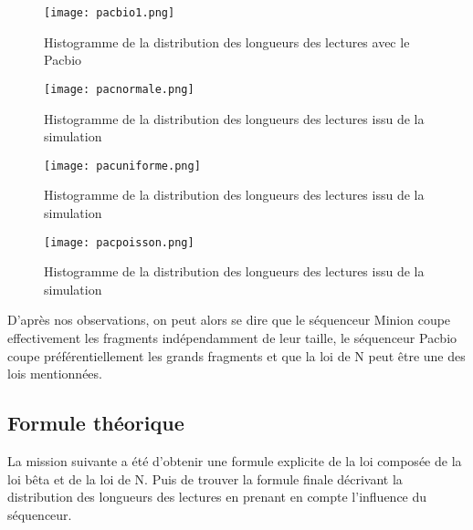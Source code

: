 \documentclass[11pt,a4paper]{article} %
\begin{document}
\begin{figure}[h]
    \begin{minipage}[c]{.46\linewidth}
        \centering
        \texttt{[image: pacbio1.png]}
        \caption{\small Histogramme de la distribution des longueurs des lectures avec le Pacbio}
    \end{minipage}
    \hfill%
    \begin{minipage}[c]{.46\linewidth}
        \centering
        \texttt{[image: pacnormale.png]}
        \caption{\small Histogramme de la distribution des longueurs des lectures issu de la simulation}
    \end{minipage}
\end{figure} 
\begin{figure}[h]
    \begin{minipage}[c]{.46\linewidth}
        \centering
        \texttt{[image: pacuniforme.png]}
        \caption{\small Histogramme de la distribution des longueurs des lectures issu de la simulation}
    \end{minipage}
    \hfill%
    \begin{minipage}[c]{.46\linewidth}
        \centering
        \texttt{[image: pacpoisson.png]}
        \caption{\small Histogramme de la distribution des longueurs des lectures issu de la simulation}
    \end{minipage}
\end{figure} 

D'après nos observations, on peut alors se dire que le séquenceur Minion coupe effectivement les fragments indépendamment de leur taille, le séquenceur Pacbio coupe préférentiellement les grands fragments et que la loi de N peut être une des lois mentionnées.\\



\subsection{Formule théorique}
La mission suivante a été d'obtenir une formule explicite de la loi composée de la loi bêta et de la loi de N. Puis de trouver la formule finale décrivant la distribution des longueurs des lectures en prenant en compte l'influence du séquenceur.  \\
\end{document}
